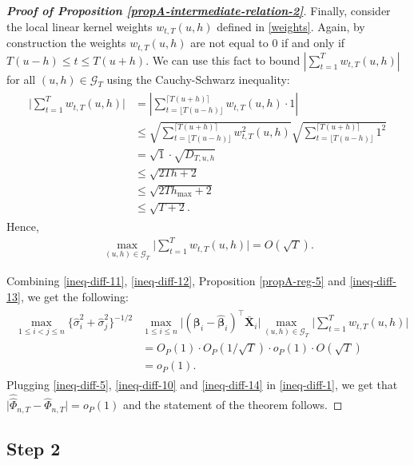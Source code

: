 \documentclass[a4paper,12pt]{article}
\newcommand{\doublehattwo}[1]{\widehat{\widehat{#1}}}
\begin{document}
\begin{proof}[\textnormal{\textbf{Proof of Proposition \ref{propA-intermediate-relation-2}}}]
Finally, consider the local linear kernel weights $w_{t,T}(u,h)$ defined in \eqref{weights}. Again, by construction the weights $w_{t, T}(u, h)$ are not equal to $0$ if and only if \linebreak $T(u-h) \le t \le T(u+h)$. We can use this fact to bound  $\left| \sum_{t=1}^T w_{t,T}(u,h)  \right|$ for all $(u, h) \in \mathcal{G}_T$ using the Cauchy-Schwarz inequality:
\begin{align}\label{weights-cauchy-schwarz}
\begin{split}
\Big| \sum_{t=1}^T w_{t,T}(u,h)   \Big| & = \left| \sum_{t=\lfloor T(u-h) \rfloor}^{\lceil T(u+h) \rceil} w_{t,T}(u,h) \cdot 1  \right|  \\
&\leq \sqrt{\sum_{t=\lfloor T(u-h) \rfloor}^{\lceil T(u+h) \rceil} w^2_{t,T}(u,h)}\sqrt{\sum_{t=\lfloor T(u-h) \rfloor}^{\lceil T(u+h) \rceil} 1^2}\\
&=\sqrt{1}\cdot\sqrt{D_{T, u, h}} \\
&  \leq \sqrt{2Th + 2} \\
&\leq \sqrt{2Th_{\max} +2} \\
&\leq\sqrt{T+2}.
\end{split}
\end{align}
Hence, 
\begin{align}\label{ineq-diff-13}
\max_{(u,h) \in \mathcal{G}_T}  \Big| \sum_{t=1}^T w_{t,T}(u,h)  \Big| = O(\sqrt{T}).
\end{align}

Combining \eqref{ineq-diff-11}, \eqref{ineq-diff-12}, Proposition \ref{propA-reg-5} and \eqref{ineq-diff-13}, we get the following:
\begin{align}\label{ineq-diff-14}
\begin{split}
\max_{1\le i < j \le n} \{\widehat{\sigma}_i^2+ \widehat{\sigma}_j^2 \}^{-1/2}&\max_{1\le i  \le n}\big|(\bm{\beta}_i - \widehat{\bm{\beta}}_i)^\top\bar{\mathbf{X}}_{i}\big| \max_{(u,h) \in \mathcal{G}_T}  \Big| \sum_{t=1}^T w_{t,T}(u,h)  \Big|   \\
&=O_P(1) \cdot O_P(1/\sqrt{T}) \cdot o_P(1) \cdot O(\sqrt{T})\\
& = o_P(1).
\end{split}
\end{align}
Plugging \eqref{ineq-diff-5}, \eqref{ineq-diff-10} and \eqref{ineq-diff-14} in \eqref{ineq-diff-1}, we get that $\big|\doublehattwo{\Phi}_{n,T} - \widehat{\Phi}_{n,T}\big| = o_P(1)$ and the statement of the theorem follows.
\end{proof}


\subsection*{Step 2}
\end{document}
